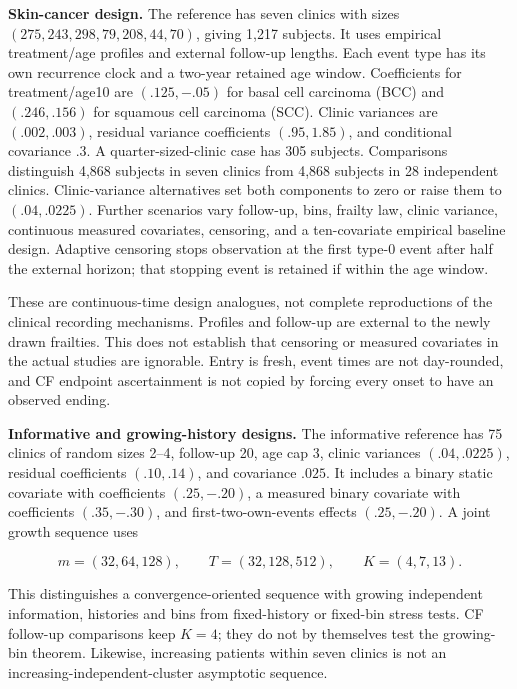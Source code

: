 \documentclass[11pt]{article}
\begin{document}
\textbf{Skin-cancer design.} The reference has seven clinics with sizes \((275,243,298,79,208,44,70)\), giving 1,217 subjects. It uses empirical treatment/age profiles and external follow-up lengths. Each event type has its own recurrence clock and a two-year retained age window. Coefficients for treatment/age10 are \((.125,-.05)\) for basal cell carcinoma (BCC) and \((.246,.156)\) for squamous cell carcinoma (SCC). Clinic variances are \((.002,.003)\), residual variance coefficients \((.95,1.85)\), and conditional covariance \(.3\). A quarter-sized-clinic case has 305 subjects. Comparisons distinguish 4,868 subjects in seven clinics from 4,868 subjects in 28 independent clinics. Clinic-variance alternatives set both components to zero or raise them to \((.04,.0225)\). Further scenarios vary follow-up, bins, frailty law, clinic variance, continuous measured covariates, censoring, and a ten-covariate empirical baseline design. Adaptive censoring stops observation at the first type-0 event after half the external horizon; that stopping event is retained if within the age window.

These are continuous-time design analogues, not complete reproductions of the clinical recording mechanisms. Profiles and follow-up are external to the newly drawn frailties. This does not establish that censoring or measured covariates in the actual studies are ignorable. Entry is fresh, event times are not day-rounded, and CF endpoint ascertainment is not copied by forcing every onset to have an observed ending.

\textbf{Informative and growing-history designs.} The informative reference has 75 clinics of random sizes 2--4, follow-up 20, age cap 3, clinic variances \((.04,.0225)\), residual coefficients \((.10,.14)\), and covariance \(.025\). It includes a binary static covariate with coefficients \((.25,-.20)\), a measured binary covariate with coefficients \((.35,-.30)\), and first-two-own-events effects \((.25,-.20)\). A joint growth sequence uses

\begin{equation*}
m=(32,64,128),\qquad T=(32,128,512),\qquad K=(4,7,13).\tag{78}\label{eq:78}
\end{equation*}

This distinguishes a convergence-oriented sequence with growing independent information, histories and bins from fixed-history or fixed-bin stress tests. CF follow-up comparisons keep \(K=4\); they do not by themselves test the growing-bin theorem. Likewise, increasing patients within seven clinics is not an increasing-independent-cluster asymptotic sequence.
\end{document}
